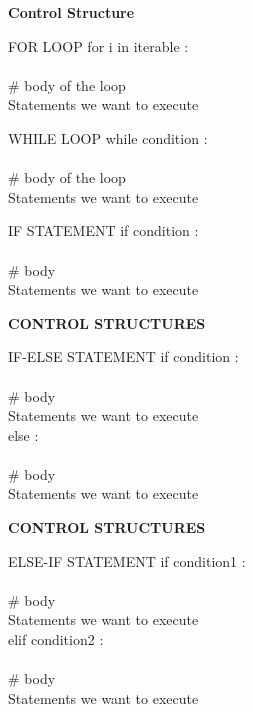 \documentclass{beamer}
\begin{document}
\begin{darkframes}
  \begin{frame}{\textbf{Control Structure}}
    \begin{block}{FOR LOOP}
      for i in iterable :\\
        \\\quad  \# body of the loop
        \\ \quad Statements we want to execute\\
    \end{block}
    
    \begin{block}{WHILE LOOP}
      while condition :\\
        \\\quad  \# body of the loop
        \\ \quad Statements we want to execute\\
     \end{block}
    
    \begin{block}{IF STATEMENT}
      if condition :\\
        \\\quad  \# body 
        \\ \quad Statements we want to execute\\
     \end{block}
     
  \end{frame}
  
  \begin{frame}{\textbf{CONTROL STRUCTURES}}
     \begin{block}{IF-ELSE STATEMENT}
      if condition :\\
        \\\quad  \# body 
        \\ \quad Statements we want to execute\\
      else : \\
        \\\quad  \# body 
        \\ \quad Statements we want to execute\\
     \end{block}
  \end{frame}
  
  \begin{frame}{\textbf{CONTROL STRUCTURES}}
     \begin{block}{ELSE-IF STATEMENT}
      if condition1 :\\
        \\\quad  \# body 
        \\ \quad Statements we want to execute\\
      elif condition2 : \\
        \\\quad  \# body 
        \\ \quad Statements we want to execute\\
     \end{block}
  \end{frame}
 

\end{darkframes}
\end{document}
